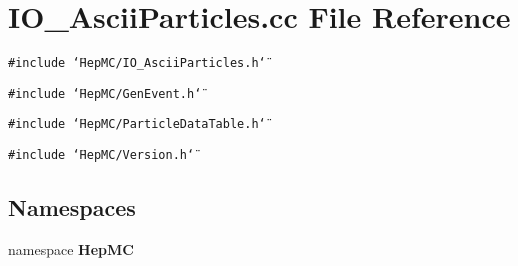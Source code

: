 \section{IO\_\-Ascii\-Particles.cc File Reference}
\label{IO__AsciiParticles_8cc}
{\tt \#include \char`\"{}Hep\-MC/IO\_\-Ascii\-Particles.h\char`\"{}}\par
{\tt \#include \char`\"{}Hep\-MC/Gen\-Event.h\char`\"{}}\par
{\tt \#include \char`\"{}Hep\-MC/Particle\-Data\-Table.h\char`\"{}}\par
{\tt \#include \char`\"{}Hep\-MC/Version.h\char`\"{}}\par
\subsection*{Namespaces}
\begin{CompactItemize}
\item 
namespace {\bf Hep\-MC}
\end{CompactItemize}
